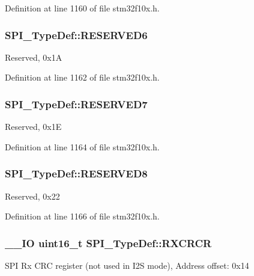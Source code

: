 Definition at line 1160 of file stm32f10x.\-h.

\hypertarget{struct_s_p_i___type_def_a0870177921541602a44f744f1b66e823}{
\subsubsection[{R\-E\-S\-E\-R\-V\-E\-D6}]{ S\-P\-I\-\_\-\-Type\-Def\-::\-R\-E\-S\-E\-R\-V\-E\-D6}}\label{struct_s_p_i___type_def_a0870177921541602a44f744f1b66e823}
Reserved, 0x1\-A 

Definition at line 1162 of file stm32f10x.\-h.

\hypertarget{struct_s_p_i___type_def_a98df0a538eb077b2cfc5194eda200f1b}{
\subsubsection[{R\-E\-S\-E\-R\-V\-E\-D7}]{ S\-P\-I\-\_\-\-Type\-Def\-::\-R\-E\-S\-E\-R\-V\-E\-D7}}\label{struct_s_p_i___type_def_a98df0a538eb077b2cfc5194eda200f1b}
Reserved, 0x1\-E 

Definition at line 1164 of file stm32f10x.\-h.

\hypertarget{struct_s_p_i___type_def_a0ffe762827b71caff20c75bf105387f6}{
\subsubsection[{R\-E\-S\-E\-R\-V\-E\-D8}]{ S\-P\-I\-\_\-\-Type\-Def\-::\-R\-E\-S\-E\-R\-V\-E\-D8}}\label{struct_s_p_i___type_def_a0ffe762827b71caff20c75bf105387f6}
Reserved, 0x22 

Definition at line 1166 of file stm32f10x.\-h.

\hypertarget{struct_s_p_i___type_def_ab53da6fb851d911ae0b1166be2cfe48a}{
\subsubsection[{R\-X\-C\-R\-C\-R}]{\setlength{\rightskip}{0pt plus 5cm}\-\_\-\-\_\-\-I\-O {\bf uint16\-\_\-t} S\-P\-I\-\_\-\-Type\-Def\-::\-R\-X\-C\-R\-C\-R}}\label{struct_s_p_i___type_def_ab53da6fb851d911ae0b1166be2cfe48a}
S\-P\-I Rx C\-R\-C register (not used in I2\-S mode), Address offset\-: 0x14

